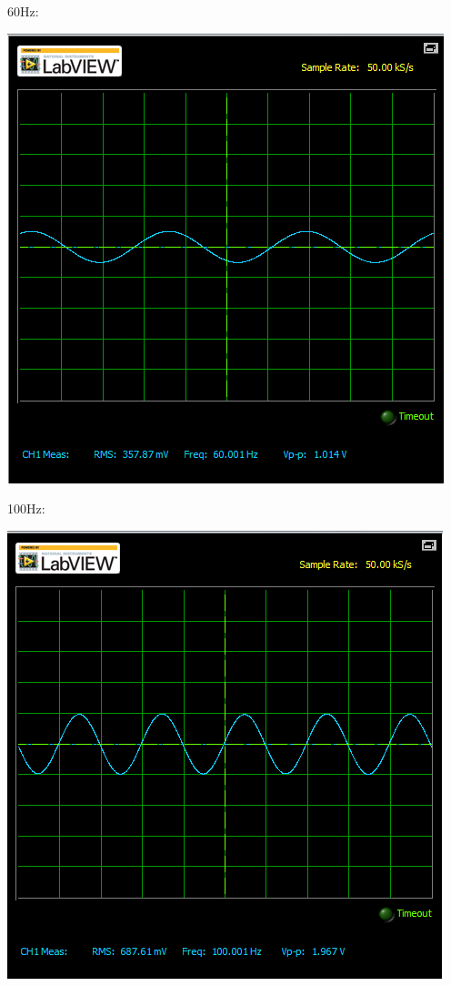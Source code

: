 \documentclass[12pt,letterpaper,boxed]{hmcpset}
\begin{document}
60Hz:
\begin{center}
\includegraphics[scale=.8]{60Hz}
\end{center}
\newpage
100Hz:
\begin{center}
\includegraphics[scale=.8]{100Hz}
\end{center}
\end{document}
